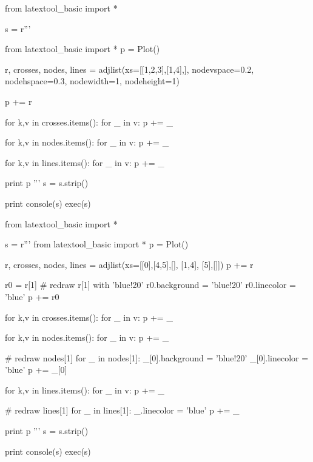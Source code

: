 \begin{python}
from latextool_basic import *

s = r'''

from latextool_basic import *
p = Plot()

r, crosses, nodes, lines = adjlist(xs=[[1,2,3],[1,4],],
                                   nodevspace=0.2, nodehspace=0.3,
                                   nodewidth=1, nodeheight=1)

p += r

for k,v in crosses.items():
    for _ in v: p += _

for k,v in nodes.items():
    for _ in v: p += _

for k,v in lines.items():
    for _ in v: p += _

print p
'''
s = s.strip()

print console(s)
exec(s)
\end{python}



























\begin{python}
from latextool_basic import *

s = r'''
from latextool_basic import *
p = Plot()

r, crosses, nodes, lines = adjlist(xs=[[0],[4,5],[], [1,4], [5],[]])
p += r

r0 = r[1] # redraw r[1] with 'blue!20'
r0.background = 'blue!20'
r0.linecolor = 'blue'
p += r0

for k,v in crosses.items():
    for _ in v: p += _

for k,v in nodes.items():
    for _ in v: p += _

# redraw nodes[1]
for _ in nodes[1]:
    _[0].background = 'blue!20'
    _[0].linecolor = 'blue'
    p += _[0]

for k,v in lines.items():
    for _ in v: p += _

# redraw lines[1]
for _ in lines[1]:
    _.linecolor = 'blue'
    p += _
    
print p
'''
s = s.strip()

print console(s)
exec(s)
\end{python}










